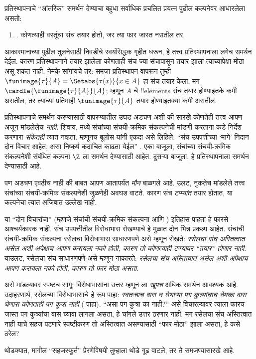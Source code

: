 \documentclass[../../../include/open-logic-section]{subfiles}
\begin{document}

प्रतिस्थापनाचे ``आंतरिक'' समर्थन देण्याचा बहुधा सर्वाधिक प्रचलित प्रयत्न पुढील कल्पनेवर आधारलेला असतो:
\begin{enumerate}
  \item[] \limofsize. कोणत्याही वस्तूंचा संच तयार होतो, जर त्या फार जास्त नसतील तर.
\end{enumerate}
आकारमानाच्या पुढील तुलनेसाठी निवडीचे स्वयंसिद्धक गृहीत धरून, हे तत्त्व प्रतिस्थापनाला लगेच समर्थन देईल. कारण प्रतिस्थापनाने तयार झालेला कोणताही संच ज्या संचापासून तयार झाला त्याच्यापेक्षा मोठा असू शकत नाही. नेमके सांगायचे तर: समजा प्रतिस्थापन वापरून तुम्ही
$\funimage{\tau}{A} = \Setabs{\tau(x)}{x \in A}$ हा संच तयार केला; मग $\cardle{\funimage{\tau}{A}}{A}$; म्हणून $A$ चे !!{element}s संच तयार होण्याइतके कमी असतील, तर त्यांच्या प्रतिमाही $\funimage{\tau}{A}$ तयार होण्याइतक्या कमी असतील.

प्रतिस्थापनाचे समर्थन करण्यासाठी \limofsize{} वापरण्यातील उघड अडचण अशी की \limofsize{} सारखे कोणतेही तत्त्व आपण अजून मांडलेलेच \emph{नाही}. शिवाय,  मध्ये संचांच्या संचयी-क्रमिक संकल्पनेची मांडणी करताना \limofsize{} कडे निर्देश करणारा \emph{संकेतही} त्यात नव्हता. म्हणूनच बूलोस यांनी एकदा असे लिहिले: ``संच उपपत्तीच्या `मागे' निदान दोन विचार आहेत, असा निष्कर्ष कदाचित काढता येईल'' \citeyearpar[p.~19]{Boolos1989}. एका बाजूला, संचांच्या संचयी-क्रमिक संकल्पनेशी संबंधित कल्पना $\Z$ ला समर्थन देण्यासाठी आहेत. दुसऱ्या बाजूला, \limofsize{} हे प्रतिस्थापनाला समर्थन देण्यासाठी आहे.

पण अडचण एवढीच नाही की \limofsize{} बाबत आपण आतापर्यंत \emph{मौन} बाळगले आहे. उलट, नुकतेच मांडलेले \limofsize{} तत्त्व संचांच्या संचयी-क्रमिक संकल्पनेशी जुळणेही अवघड वाटते. कारण संच \emph{टप्प्यांत} तयार होतात, या कल्पनेचा त्यात अजिबात उल्लेख नाही.

या ``दोन विचारांचा'' (म्हणजे संचांची संचयी-क्रमिक संकल्पना आणि \limofsize) इतिहास पाहता हे फारसे आश्चर्यकारक नाही. संच उपपत्तीतील विरोधाभास रोखण्याचे हे मुळात दोन भिन्न प्रकल्प आहेत. संचांची संचयी-क्रमिक संकल्पना रसेलचा विरोधाभास साधारणपणे असे म्हणून रोखते: \emph{रसेलचा संच अस्तित्वात असेल अशी अपेक्षाच आपण करायला नको होती, कारण तो कोणत्याही टप्प्यावर ``तयार'' होणार नाही}. याउलट, \limofsize{} रसेलचा संच साधारणपणे असे म्हणून नाकारते: \emph{रसेलचा संच अस्तित्वात असेल अशी अपेक्षाच आपण करायला नको होती, कारण तो फार मोठा असता}.

असे मांडल्यावर स्पष्टच सांगू: विरोधाभासांना उत्तर म्हणून \limofsize{} ला \emph{खूपच} अधिक समर्थन आवश्यक आहे. उदाहरणार्थ, रसेलच्या विरोधाभासाचे हे रूप पाहा: \emph{स्वतःचाच वास न घेणाऱ्या पग कुत्र्यांचाच नेमका वास घेणारा कोणताही पग कुत्रा नाही} ( पाहा). ``असा पग कुत्रा का नाही?'' असे विचारल्यावर त्याला फारच जास्त पग कुत्र्यांचा वास घ्यावा लागला असता, हे चांगले उत्तर ठरणार नाही. मग रसेलचा संच अस्तित्वात नाही याचे सहज पटणारे स्पष्टीकरण तो अस्तित्वात असण्यासाठी ``फार मोठा'' झाला असता, हे कसे ठरेल?

थोडक्यात, \limofsize{} मागील ``सहजस्फूर्त'' प्रेरणेविषयी तुम्हाला थोडे गूढ वाटले, तर ते समजण्यासारखे आहे.
\end{document}
